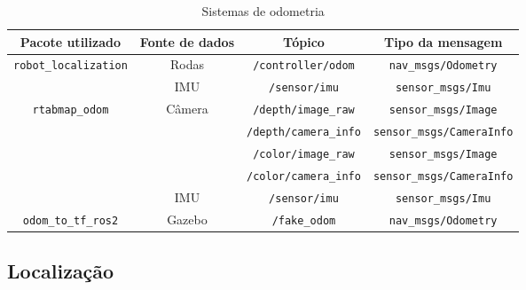 \documentclass[repeatfields,xlists,xpacks,oneside,yearsonly]{ufrgscca}
\begin{document}
\begin{table}[H]
    \begin{center}
        \caption{Sistemas de odometria}
        \label{tab:odometria}
        \small
        \begin{tabularx}{\linewidth}{c|c|c|c}
            Pacote utilizado                              & Fonte de dados          & Tópico                       & Tipo da mensagem                 \\
            \hline
            \multirow{2}{*}{\texttt{robot\_localization}} & Rodas                   & \texttt{/controller/odom}    & \texttt{nav\_msgs/Odometry}      \\
                                                          & IMU                     & \texttt{/sensor/imu}         & \texttt{sensor\_msgs/Imu}        \\
            \hline
            \multirow{5}{*}{\texttt{rtabmap\_odom}}       & \multirow{4}{*}{Câmera} & \texttt{/depth/image\_raw}   & \texttt{sensor\_msgs/Image}      \\
                                                          &                         & \texttt{/depth/camera\_info} & \texttt{sensor\_msgs/CameraInfo} \\
                                                          &                         & \texttt{/color/image\_raw}   & \texttt{sensor\_msgs/Image}      \\
                                                          &                         & \texttt{/color/camera\_info} & \texttt{sensor\_msgs/CameraInfo} \\
                                                          & IMU                     & \texttt{/sensor/imu}         & \texttt{sensor\_msgs/Imu}        \\
            \hline
            \texttt{odom\_to\_tf\_ros2}                   & Gazebo                  & \texttt{/fake\_odom}         & \texttt{nav\_msgs/Odometry}      \\
        \end{tabularx}
    \end{center}
\end{table}

\subsection{Localização}
\label{met:localizacao}
\end{document}
